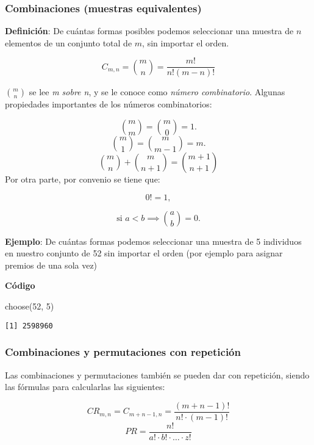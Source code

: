 \documentclass[
]{article}
\newenvironment{Shaded}{\begin{snugshade}}{\end{snugshade}}
\newcommand{\DecValTok}[1]{\textcolor[rgb]{0.00,0.00,0.81}{#1}}
\newcommand{\FunctionTok}[1]{\textcolor[rgb]{0.00,0.00,0.00}{#1}}
\newcommand{\NormalTok}[1]{#1}
\begin{document}
\hypertarget{combinaciones-muestras-equivalentes}{%
\subsubsection{Combinaciones (muestras
equivalentes)}\label{combinaciones-muestras-equivalentes}}

\textbf{Definición}: De cuántas formas posibles podemos seleccionar una
muestra de \(n\) elementos de un conjunto total de \(m\), sin importar
el orden.

\[\mathit{C}_{m,n} = \binom{m}{n} = \frac{m!}{n!(m-n)!}\]

\(\binom{m}{n}\) se lee \emph{m sobre n}, y se le conoce como
\emph{número combinatorio}. Algunas propiedades importantes de los
números combinatorios:

\[\binom{m}{m} = \binom{m}{0} = 1.\]
\[\binom{m}{1} = \binom{m}{m-1} = m.\]
\[\binom{m}{n} + \binom{m}{n+1} = \binom{m+1}{n+1}\] Por otra parte, por
convenio se tiene que:

\[0!=1,\]

\[\text{si } a <b \implies \binom{a}{b} = 0.\]

\textbf{Ejemplo}: De cuántas formas podemos seleccionar una muestra de 5
individuos en nuestro conjunto de 52 sin importar el orden (por ejemplo
para asignar premios de una sola vez)

\textbf{Código}

\begin{Shaded}
\begin{Highlighting}[]
\FunctionTok{choose}\NormalTok{(}\DecValTok{52}\NormalTok{, }\DecValTok{5}\NormalTok{)}
\end{Highlighting}
\end{Shaded}

\begin{verbatim}
[1] 2598960
\end{verbatim}

\hypertarget{combinaciones-y-permutaciones-con-repeticiuxf3n}{%
\subsubsection{Combinaciones y permutaciones con
repetición}\label{combinaciones-y-permutaciones-con-repeticiuxf3n}}

Las combinaciones y permutaciones también se pueden dar con repetición,
siendo las fórmulas para calcularlas las siguientes:

\[\mathit{CR}_{m,n}= \mathit{C}_{m+n-1,n}= \frac{(m+n-1)!}{n!\cdot(m-1)!}\]
\[\mathit{PR} = \frac{n!}{a!\cdot b!\cdot \ldots\cdot z!}\]
\end{document}
